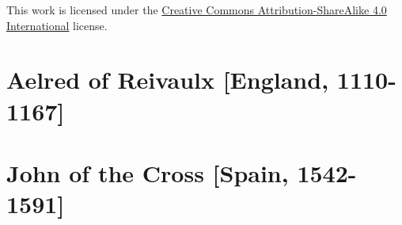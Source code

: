 

\frontmatter
\thispagestyle{empty}
\vspace*{\fill}
\clearpage

\thispagestyle{empty}
\vspace*{\fill}
\begin{center}
	{\footnotesize\noindent This work is licensed under the \href{https://creativecommons.org/licenses/by-sa/4.0/}{Creative Commons Attribution-ShareAlike 4.0 International} license.}\bigskip
\end{center}
\vspace*{2in}

\mainmatter
\chapter*{Aelred of Reivaulx [England, 1110-1167]}
    

\chapter*{John of the Cross [Spain, 1542-1591]}
	

